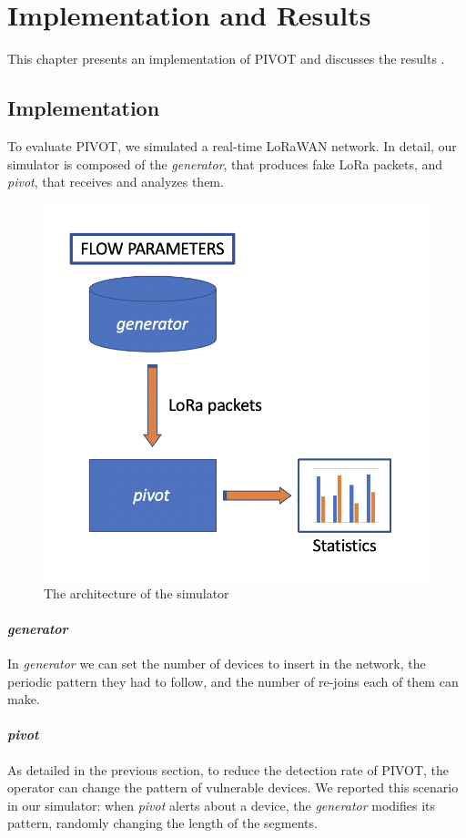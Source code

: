 \chapter{Implementation and Results}
\label{implementation}
This chapter presents an implementation of PIVOT and discusses the results \cite{terenzi}.

\section{Implementation}
\label{implementation_2}
To evaluate PIVOT, we simulated a real-time LoRaWAN network. In detail, our simulator is composed of the \textit{generator}, that produces fake LoRa packets, and \textit{pivot}, that receives and analyzes them.

\begin{figure}
    \centering
    \includegraphics[width=0.5\linewidth]{images/implementation/simulator.png}
    \caption{The architecture of the simulator}
    \label{fig:simulator}
\end{figure}

\subsubsection{\textit{generator}}
In \textit{generator} we can set the number of devices to insert in the network, the periodic pattern they had to follow, and the number of re-joins each of them can make. 

\subsubsection{\textit{pivot}}
As detailed in the previous section, to reduce the detection rate of PIVOT, the operator can change the pattern of vulnerable devices. We reported this scenario in our simulator: when \textit{pivot} alerts about a device, the \textit{generator} modifies its pattern, randomly changing the length of the segments.

